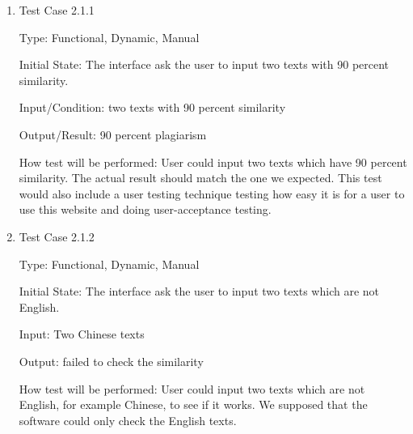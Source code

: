 \documentclass[12pt, titlepage]{article}
\begin{document}
\begin{enumerate}

\item{Test Case 2.1.1\\}

Type: Functional, Dynamic, Manual 
					
Initial State: The interface ask the user to input two texts with 90 percent similarity.
					
Input/Condition: two texts with 90 percent similarity
					
Output/Result: 90 percent plagiarism
					
How test will be performed: User could input two texts which have 90 percent similarity. The actual result should match the one we expected. This test would also include a user testing technique testing how easy it is for a user to use this website and doing user-acceptance testing.
					
\item{Test Case 2.1.2\\}

Type: Functional, Dynamic, Manual
					
Initial State: The interface ask the user to input two texts which are not English.
					
Input: Two Chinese texts
					
Output: failed to check the similarity
					
How test will be performed: User could input two texts which are not English, for example Chinese, to see if it works. We supposed that the software could only check the English texts.

\end{enumerate}
\end{document}
